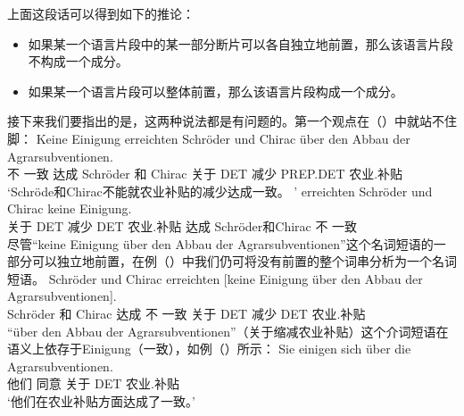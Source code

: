 \noindent
上面这段话可以得到如下的推论：
\begin{itemize}
\item 如果某一个语言片段中的某一部分断片可以各自独立地前置，那么该语言片段不构成一个成分。
\item 如果某一个语言片段可以整体前置，那么该语言片段构成一个成分。
\end{itemize}
接下来我们要指出的是，这两种说法都是有问题的。第一个观点在（）中就站不住脚：
\eal
\ex
\gll Keine Einigung erreichten Schröder und Chirac über den Abbau der Agrarsubventionen.\footnotemark\\
     不 一致 达成 Schröder 和 Chirac 关于 DET 减少 PREP.DET 农业.补贴\\
\glt `Schröde和Chirac不能就农业补贴的减少达成一致。 '
\ex 
{}     erreichten Schröder und Chirac keine Einigung.\\
     \spacebr{}关于 DET 减少 DET 农业.补贴 达成 Schröder和Chirac 不 一致\\
\zl
尽管“keine Einigung über den Abbau der Agrarsubventionen”这个名词短语的一部分可以独立地前置，在例（）中我们仍可将没有前置的整个词串分析为一个名词短语。
\ea
\gll Schröder und Chirac erreichten [keine Einigung über den Abbau der Agrarsubventionen].\\
     Schröder 和 Chirac 达成 \spacebr{}不 一致 关于 DET 减少 DET 农业.补贴\\
\z
“über den Abbau der Agrarsubventionen”（关于缩减农业补贴）这个介词短语在语义上依存于Einigung（一致），如例（）所示：
\ea
\gll Sie einigen sich über die Agrarsubventionen.\\
     他们 同意  关于 DET 农业.补贴\\
\glt `他们在农业补贴方面达成了一致。'
\z

